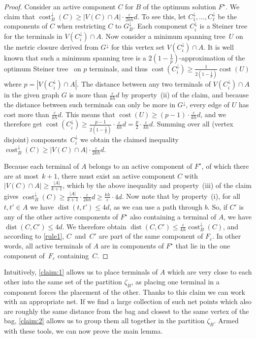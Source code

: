 \documentclass[a4paper]{article}
\theoremstyle{plain}
\newcommand{\eps}{{\varepsilon}}
\DeclareMathOperator{\cost}{cost}
\DeclareMathOperator{\dist}{dist}
\begin{document}
%
\begin{proof}%
Consider an active component $C$ for $B$ of the optimum solution $F^\star$. We 
claim that $\cost^\downarrow_{B}(C)\ge |V(C)\cap A|\cdot \frac{\eps}{2kh}d$. 
%
%
%
    To see this, let $C^\downarrow_1,\ldots,C^\downarrow_\ell$ be the components of $C$ when restricting $C$ to $G^\downarrow_B$. Each component $C^\downarrow_i$ is a Steiner tree for the terminals in $V(C^\downarrow_i)\cap A$. Now consider a minimum spanning tree~$U$ on the metric closure derived from $G^\downarrow$ for this vertex set $V(C^\downarrow_i)\cap A$. It is well known that such a minimum spanning tree is a $2(1-\frac{1}{p})$-approximation of the optimum Steiner tree~\cite{KouMB81} on $p$ terminals, and thus $\cost(C^\downarrow_i)\geq\frac{1}{2(1-\frac{1}{p})}\cost(U)$ where $p=|V(C^\downarrow_i)\cap A|$. The distance between any two terminals of $V(C^\downarrow_i)\cap A$ in the given graph $G$ is more than $\frac{\eps}{kh}d$ by property~(ii) of the claim, and because the distance between such terminals can only be more in $G^\downarrow$, every edge of $U$ has cost more than $\frac{\eps}{kh}d$. This means that $\cost(U)\geq (p-1)\cdot\frac{\eps}{kh}d$, and we therefore get $\cost(C^\downarrow_i)\ge \frac{p-1}{2(1-\frac{1}{p})}\cdot \frac{\eps}{kh}d =\frac{p}{2}\cdot\frac{\eps}{kh}d$. Summing over all (vertex disjoint) components~$C^\downarrow_i$ we obtain the claimed inequality $\cost^\downarrow_{B}(C)\ge |V(C)\cap A|\cdot \frac{\eps}{2kh}d$.

    Because each terminal of $A$ belongs to an active component of $F^\star$, of which there are at most~$k+1$, there must exist an active component $C$ with $|V(C)\cap A|\geq\frac{|A|}{k+1}$, which by the above inequality and property~(iii) of the claim gives $\cost^\downarrow_{B}(C)\ge \frac{|A|}{k+1}\cdot \frac{\eps}{2kh}d\ge \frac{kh}{\eps}\cdot 4d$.
    Now note that by property~(i), for all $t,t'\in A$ we have $\dist(t,t')\le 4d$, as we can use a path through $b$. So, if $C'$ is any of the other active components of $F^\star$ also containing a terminal of $A$, we have $\dist(C,C')\le 4d$. We therefore obtain $\dist(C,C')\le \frac{\eps}{kh}\cost^\downarrow_{B}(C)$, and according to \autoref{rule1}, $C$~and~$C'$ are part of the same component of $F_\eps$. In other words, all active terminals of $A$ are in components of $F^\star$ that lie in the one component of~$F_\eps$ containing~$C$.
\end{proof}
%

Intuitively, \autoref{claim:1} allows us to place terminals of $A$ which are very close to each other into the same set of the partition $\zeta_B$, as placing one terminal in a component forces the placement of the other. Thanks to this claim we can work with an appropriate net. 
If we find a large collection of such net points which also are roughly the same distance from the bag and closest to the same vertex of the bag, \autoref{claim:2} allows us to group them all together in the partition $\zeta_B$.
Armed with these tools, we can now prove the main lemma.
\end{document}
